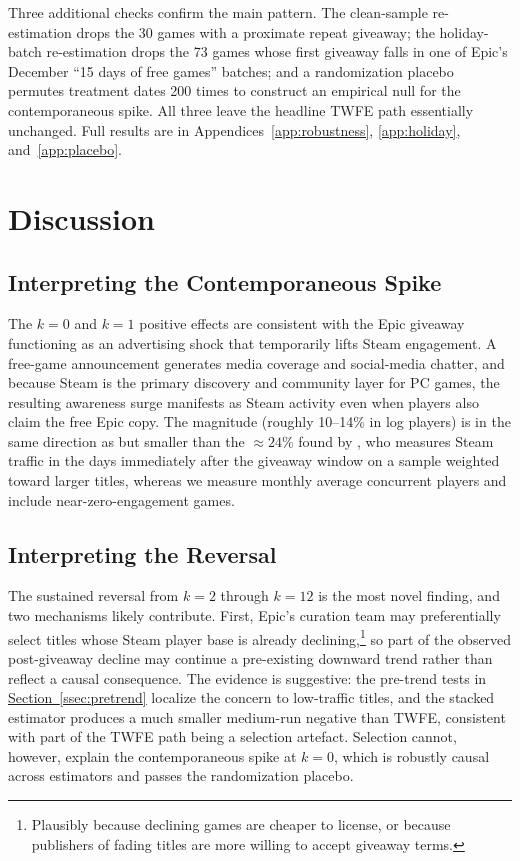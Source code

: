 \documentclass[11pt]{article}
\newcommand{\secref}[1]{\hyperref[#1]{Section~\ref*{#1}}}
\begin{document}
Three additional checks confirm the main pattern. The clean-sample
re-estimation drops the 30 games with a proximate repeat giveaway; the
holiday-batch re-estimation drops the 73 games whose first giveaway falls in
one of Epic's December ``15 days of free games'' batches; and a randomization
placebo permutes treatment dates 200 times to construct an empirical null for
the contemporaneous spike. All three leave the headline TWFE path essentially
unchanged. Full results are in Appendices~\ref{app:robustness},
\ref{app:holiday}, and~\ref{app:placebo}.

\section{Discussion}
\label{sec:discussion}

\subsection{Interpreting the Contemporaneous Spike}

The $k = 0$ and $k = 1$ positive effects are consistent with the Epic giveaway
functioning as an advertising shock that temporarily lifts Steam engagement.
A free-game announcement generates media coverage and social-media chatter, and
because Steam is the primary discovery and community layer for PC games, the
resulting awareness surge manifests as Steam activity even when players also
claim the free Epic copy. The magnitude (roughly 10--14\% in log players) is in
the same direction as but smaller than the $\approx 24\%$ found by
\citet{clarkson2025}, who measures Steam traffic in the days immediately
after the giveaway window on a sample weighted toward larger titles, whereas
we measure monthly average concurrent players and include near-zero-engagement
games.

\subsection{Interpreting the Reversal}

The sustained reversal from $k = 2$ through $k = 12$ is the most novel
finding, and two mechanisms likely contribute. First, Epic's curation team
may preferentially select titles whose Steam player base is already
declining,\footnote{Plausibly because declining games are cheaper to license,
or because publishers of fading titles are more willing to accept giveaway
terms.} so part of the observed post-giveaway decline may continue a
pre-existing downward trend rather than reflect a causal consequence. The
evidence is suggestive: the pre-trend tests in \secref{ssec:pretrend}
localize the concern to low-traffic titles, and the stacked estimator
produces a much smaller medium-run negative than TWFE, consistent with part
of the TWFE path being a selection artefact. Selection cannot, however,
explain the contemporaneous spike at $k = 0$, which is robustly causal across
estimators and passes the randomization placebo.
\end{document}
